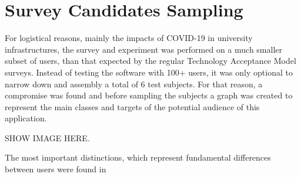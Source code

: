 \section{Survey Candidates Sampling}

For logistical reasons, mainly the impacts of COVID-19 in university 
infrastructures, the survey and experiment was performed on a much 
smaller subset of users, than that 
expected by the regular Technology Acceptance Model surveys. 
Instead of testing the software with 100+ users, it was only 
optional to narrow down and assembly a total of
6 test subjects. For that reason, a compromise was found 
and before sampling the subjects
a graph was created to represent the main classes and targets 
of the potential audience of this application.

SHOW IMAGE HERE.

The most important distinctions, which represent fundamental 
differences between users
were found in 

